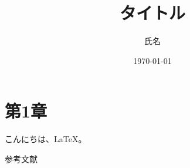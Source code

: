 \documentclass[uplatex,a4paper]{jsarticle}
\title{タイトル}
\author{氏名}
\date{\today}
\begin{document}
\maketitle
\thispagestyle{empty}
\clearpage
\tableofcontents
\clearpage

\section{第1章}
 こんにちは、\LaTeX。

\begin{thebibliography}{99}
     参考文献
\end{thebibliography}
\end{document}
